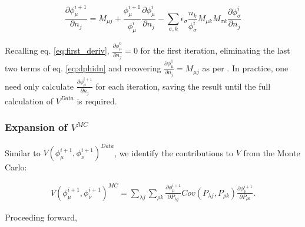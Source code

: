 %
\begin{equation} \label{eq:dphidn}
	\frac{\partial \phi^{i+1}_{\mu}}{\partial n_{j}}
	= M_{\mu j} + \frac{\phi^{i+1}_{\mu}}{\phi^{i}_{\mu}} \frac{\partial \phi^{i}_{\mu}}{\partial n_{j}}
	- \sum_{\sigma, k}{ \epsilon_{\sigma} \frac{n_{k}}{\phi^{i}_{\sigma}} M_{\mu k} M_{\sigma k} \frac{\partial \phi^{i}_{\sigma}}{\partial n_{j}}}
\end{equation}

Recalling eq. \ref{eq:first_deriv}, $\frac{\partial \phi^{0}_{\mu}}{\partial n_{j}} = 0$ for the first iteration, eliminating the last two terms of eq. \ref{eq:dphidn} and recovering $\frac{\partial \phi^{1}_{\mu}}{\partial n_{j}} = M_{\mu j}$ as per \cite{agostini}. In practice, one need only calculate $\frac{\partial \phi^{i+1}_{\mu}}{\partial n_{j}}$ for each iteration, saving the result until the full calculation of $V^{Data}$ is required.

\subsubsection{Expansion of $V^{MC}$} \label{ExpVm}

Similar to $V(\phi^{i+1}_{\mu},\phi^{i+1}_{\nu})^{Data}$, we identify the contributions to $V$ from the Monte Carlo:

\begin{align*}
	V(\phi^{i+1}_{\mu},\phi^{i+1}_{\nu})^{MC} = 
	\sum_{\lambda j} \sum_{\rho k}
	\frac{\partial \phi^{i+1}_{\mu}}{\partial P_{\lambda j}} 
	Cov(P_{\lambda j},P_{\rho k}) 
	\frac{\partial \phi^{i+1}_{\nu}}{\partial P_{\rho k}}.
\end{align*}

Proceeding forward,


